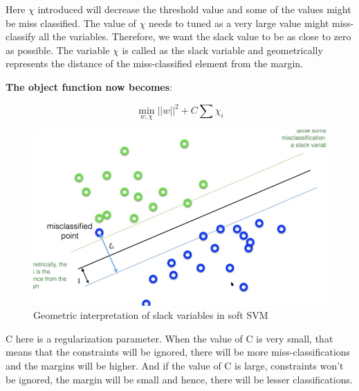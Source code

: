 \documentclass[11pt]{article}
\begin{document}
Here $\chi$ introduced will decrease the threshold value and some of the values might be miss classified. The value of $\chi$ needs to tuned as a very large value might miss-classify all the variables. Therefore, we want the slack value to be as close to zero as possible. The variable $\chi$ is called as the slack variable and geometrically represents the distance of the miss-classified element from the margin. 

\textbf{The object function now becomes}:

\begin{equation}
\min_{w,\chi}||w||^{2} + C \sum{\chi_i}
\end{equation}

\begin{figure}[H]
\begin{center}
\includegraphics[scale=0.30]{figures/SlackInterpretation.png}
\end{center}
\caption{Geometric interpretation of slack variables in soft SVM}
\label{fig:Slackvariables}
\end{figure}

C here is a regularization parameter. When the value of C is very small, that means that the constraints will be ignored, there will be more miss-classifications and the margins will be higher. And if the value of C is large, constraints won't be ignored, the margin will be small and hence, there will be lesser classifications.
\end{document}
